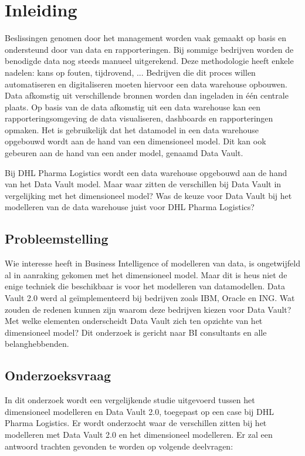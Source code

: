 
\chapter{Inleiding}
\label{ch:inleiding}
Beslissingen genomen door het management worden vaak gemaakt op basis en ondersteund door van data en rapporteringen. Bij sommige bedrijven worden de benodigde data nog steeds manueel uitgerekend. Deze methodologie heeft enkele nadelen: kans op fouten, tijdrovend, ... Bedrijven die dit proces willen automatiseren en digitaliseren moeten hiervoor een data warehouse opbouwen. Data afkomstig uit verschillende bronnen worden dan ingeladen in één centrale plaats. Op basis van de data afkomstig uit een data warehouse kan een rapporteringsomgeving de data visualiseren, dashboards en rapporteringen opmaken. Het is gebruikelijk dat het datamodel in een data warehouse opgebouwd wordt aan de hand van een dimensioneel model. Dit kan ook gebeuren aan de hand van een ander model, genaamd Data Vault. 

Bij DHL Pharma Logistics wordt een data warehouse opgebouwd aan de hand van het Data Vault model. Maar waar zitten de verschillen bij Data Vault in vergelijking met het dimensioneel model? Was de keuze voor Data Vault bij het modelleren van de data warehouse juist voor DHL Pharma Logistics?



\section{Probleemstelling}
\label{sec:probleemstelling}

Wie interesse heeft in Business Intelligence of modelleren van data, is ongetwijfeld al in aanraking gekomen met het dimensioneel model. Maar dit is heus niet de enige techniek die beschikbaar is voor het modelleren van datamodellen. Data Vault 2.0 werd al geïmplementeerd bij bedrijven zoals IBM, Oracle en ING. Wat zouden de redenen kunnen zijn waarom deze bedrijven kiezen voor Data Vault? Met welke elementen onderscheidt Data Vault zich ten opzichte van het dimensioneel model? Dit onderzoek is gericht naar BI consultants en alle belanghebbenden.

\section{Onderzoeksvraag}
\label{sec:onderzoeksvraag}
In dit onderzoek wordt een vergelijkende studie uitgevoerd tussen het dimensioneel modelleren en Data Vault 2.0, toegepast op een case bij DHL Pharma Logistics. Er wordt onderzocht waar de verschillen zitten bij het modelleren met Data Vault 2.0 en het dimensioneel modelleren. Er zal een antwoord trachten gevonden te worden op volgende deelvragen:

